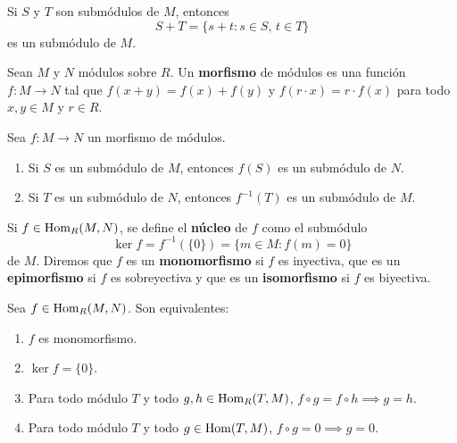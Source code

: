\begin{exercise}
Si $S$ y $T$ son submódulos de $M$, entonces 
\[
S+T=\{s+t:s\in S,\,t\in T\}
\]
es un submódulo de $M$.
\end{exercise}

\begin{definition}
Sean $M$ y $N$ módulos sobre $R$. 
Un \textbf{morfismo} de módulos es una función $f\colon M\to N$ tal que $f(x+y)=f(x)+f(y)$ y 
$f(r\cdot x)=r\cdot f(x)$ para todo $x,y\in M$ y $r\in R$. 
\end{definition}

\begin{exercise}
Sea $f\colon M\to N$ un morfismo de módulos. 
\begin{enumerate}
\item Si $S$ es un submódulo de $M$, entonces $f(S)$ es un submódulo de $N$.
\item Si $T$ es un submódulo de $N$, entonces $f^{-1}(T)$ es un submódulo de $M$.
\end{enumerate}
\end{exercise}

Si $f\in\operatorname{Hom}_R(M,N)$, se define el \textbf{núcleo} de $f$ como el submódulo 
\[
\ker f=f^{-1}(\{0\})=\{m\in M:f(m)=0\}
\]
de $M$. Diremos que $f$ es un \textbf{monomorfismo} si $f$ es inyectiva, que
es un \textbf{epimorfismo} si $f$ es sobreyectiva y que es un \textbf{isomorfismo} 
si $f$ es biyectiva. 

\begin{exercise}
Sea $f\in\operatorname{Hom}_R(M,N)$. Son equivalentes:
\begin{enumerate}
\item $f$ es monomorfismo.
\item $\ker f=\{0\}$.
\item Para todo módulo $T$ y todo $g,h\in\operatorname{Hom}_R(T,M)	$, $f\circ g=f\circ h\implies g=h$.
\item Para todo módulo $T$ y todo $g\in\operatorname{Hom}(T,M)$, $f\circ g=0\implies g=0$.
\end{enumerate}
\end{exercise}


